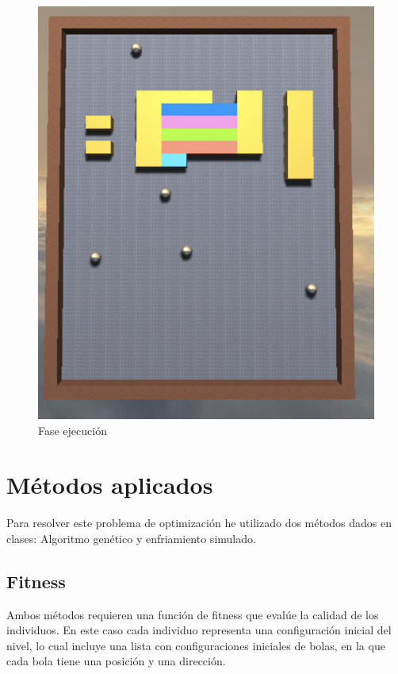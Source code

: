 \documentclass[a4paper, 11pt]{article}
\begin{document}
\begin{figure}[htb!]
\begin{minipage}{0.4\textwidth}
    		\includegraphics[scale=.5]{images/arkanoid_2}
    		\caption{Fase ejecución}
    		\label{fig:arkanoid_2}
    	\end{minipage}\hfill
    \end{figure}

	 	
\section{Métodos aplicados}
	Para resolver este problema de optimización he utilizado dos métodos dados en clases: Algoritmo genético y enfriamiento simulado.
	 	
 	\subsection{Fitness}
 		Ambos métodos requieren una función de fitness que evalúe la calidad de los individuos.
		En este caso cada individuo representa una configuración inicial del nivel, lo cual incluye una lista con configuraciones iniciales de bolas, en la que cada bola tiene una posición y una dirección. \\
 
\end{document}
